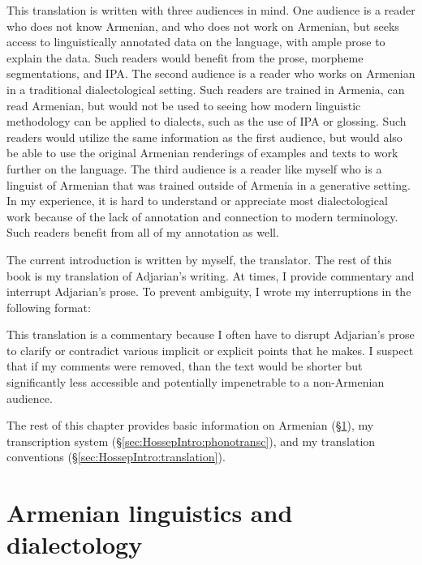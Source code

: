 \documentclass[output=paper]{langscibook}
\begin{document}
This translation is written with three audiences in mind. One audience is a reader who does not know Armenian, and who does not  work  on Armenian, but seeks access to linguistically annotated data on the language, with ample prose to explain the data. Such readers would benefit from the prose, morpheme segmentations, and IPA. The second audience is a reader who works on Armenian in a traditional dialectological setting. Such readers are trained in Armenia, can read Armenian, but would not be used to seeing how modern linguistic methodology can be applied to dialects, such as the use of IPA or glossing. Such readers would utilize the same information as the first audience, but would also be able to use the original Armenian renderings of examples and texts to work further on the language. The third audience is  a reader like myself who is a linguist of Armenian that was trained outside of Armenia in a generative setting. In my experience, it is hard to understand or appreciate most dialectological work because of the lack of annotation and connection to modern terminology. Such readers benefit from all of my annotation as well.   


The current introduction is written by myself, the translator. The rest of this book is my translation of Adjarian's writing. At times, I provide commentary and interrupt Adjarian's prose. To prevent ambiguity, I wrote my interruptions in the following format:

\begin{center}
\end{center}

This translation is a commentary because I often have to disrupt Adjarian's prose to clarify or contradict various implicit or explicit points that he makes. I suspect that if my comments were removed, than the text would be shorter but significantly less accessible and potentially impenetrable to a non\hyp Armenian audience. 




The rest of this chapter provides basic information on Armenian (\S\ref{sec:HossepIntro:armenian}), my transcription system (\S\ref{sec:HossepIntro:phonotransc}),   and my translation conventions (\S\ref{sec:HossepIntro:translation}).





\section{Armenian linguistics and dialectology}\label{sec:HossepIntro:armenian}
\end{document}
